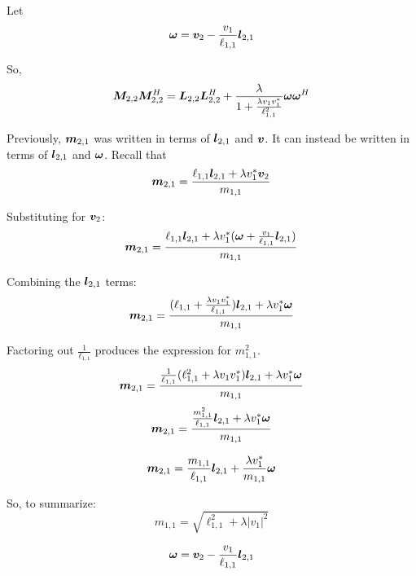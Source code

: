 \begin{appendices}
Let
\begin{equation}
\bm{\omega} = \bm{v}_2 - \frac{v_1}{\ell_{1,1}}\bm{l}_{2,1}
\end{equation}

So,
\begin{equation}
\bm{M}_{2,2}\bm{M}_{2,2}^H = \bm{L}_{2,2}\bm{L}_{2,2}^H + \frac{\lambda}{1 + \frac{\lambda v_1 v_1^{*}}{\ell_{1,1}^2}}\bm{\omega}\bm{\omega}^H
\end{equation}

Previously, $\bm{m}_{2,1}$ was written in terms of $\bm{l}_{2,1}$ and $\bm{v}$. It can instead be written in terms of $\bm{l}_{2,1}$ and $\bm{\omega}$. Recall that
\begin{equation}
\bm{m}_{2,1} = \frac{\ell_{1,1}\bm{l}_{2,1} + \lambda v_1^{*}\bm{v}_2}{m_{1,1}}
\end{equation}

Substituting for $\bm{v}_2$:
\begin{equation}
\bm{m}_{2,1} = \frac{\ell_{1,1}\bm{l}_{2,1} + \lambda v_1^{*}(\bm{\omega} + \frac{v_1}{\ell_{1,1}}\bm{l}_{2,1})}{m_{1,1}}
\end{equation}

Combining the $\bm{l}_{2,1}$ terms:
\begin{equation}
\bm{m}_{2,1} = \frac{(\ell_{1,1} +  \frac{\lambda v_1 v_1^{*}}{\ell_{1,1}}) \bm{l}_{2,1} + \lambda v_1^{*}\bm{\omega}}{m_{1,1}}
\end{equation}

Factoring out $\frac{1}{\ell_{1,1}}$ produces the expression for $m_{1,1}^2$.
\begin{equation}
\bm{m}_{2,1} = \frac{\frac{1}{\ell_{1,1}}(\ell_{1,1}^2 +  \lambda v_1 v_1^{*}) \bm{l}_{2,1} + \lambda v_1^{*}\bm{\omega}}{m_{1,1}}
\end{equation}
\begin{equation}
\bm{m}_{2,1} = \frac{\frac{m_{1,1}^2}{\ell_{1,1}} \bm{l}_{2,1} + \lambda v_1^{*}\bm{\omega}}{m_{1,1}}
\end{equation}

\begin{equation}
\bm{m}_{2,1} = \frac{m_{1,1}}{\ell_{1,1}} \bm{l}_{2,1} + \frac{\lambda v_1^{*}}{m_{1,1}}\bm{\omega}
\end{equation}

So, to summarize:
\begin{equation}
m_{1,1} = \sqrt{\ell_{1,1}^2 + \lambda |v_1|^2}
\end{equation}

\begin{equation}
\bm{\omega} = \bm{v}_2 - \frac{v_1}{\ell_{1,1}}\bm{l}_{2,1}
\end{equation}


\end{appendices}
